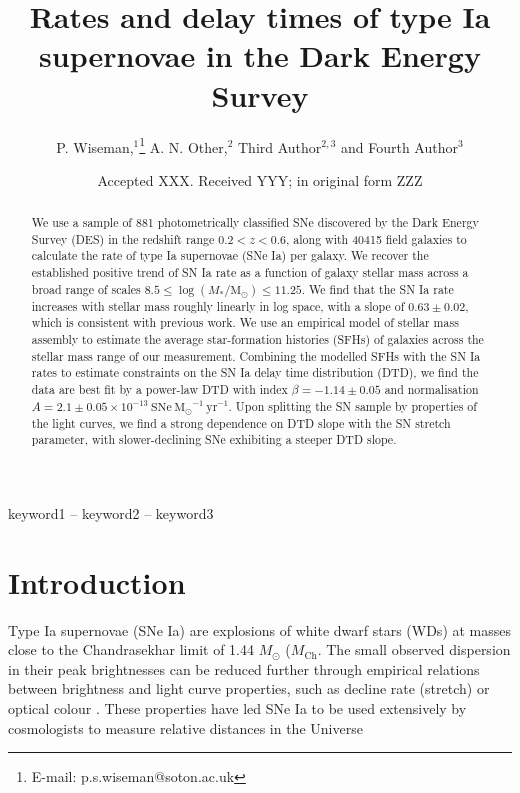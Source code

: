\documentclass[fleqn,usenatbib]{mnras}
\title[Rates of SNe Ia in DES]{Rates and delay times of type Ia supernovae in the Dark Energy Survey}
\author[P. Wiseman et al.]{
P. Wiseman,$^{1}$\thanks{E-mail: p.s.wiseman@soton.ac.uk}
A. N. Other,$^{2}$
Third Author$^{2,3}$
and Fourth Author$^{3}$
\\
}
\date{Accepted XXX. Received YYY; in original form ZZZ}
\begin{document}
\label{firstpage}
\pagerange{\pageref{firstpage}--\pageref{lastpage}}
\maketitle

\begin{abstract}
We use a sample of 881 photometrically classified SNe discovered by the Dark Energy Survey (DES) in the redshift range $0.2 < z <0.6$, along with 40415 field galaxies to calculate the rate of type Ia supernovae (SNe Ia) per galaxy. We recover the established positive trend of SN Ia rate as a function of galaxy stellar mass across a broad range of scales $8.5 \leq \log(M_*/\mathrm{M}_{\odot}) \leq 11.25$. We find that the SN Ia rate increases with stellar mass roughly linearly in log space, with a slope of $0.63 \pm 0.02$, which is consistent with previous work. We use an empirical model of stellar mass assembly to estimate the average star-formation histories (SFHs) of galaxies across the stellar mass range of our measurement. Combining the modelled SFHs with the SN Ia rates to estimate constraints on the SN Ia delay time distribution (DTD), we find the data are best fit by a power-law DTD with index $\beta = -1.14 \pm 0.05$ and normalisation $A = 2.1 \pm0.05 \times 10^{-13}~\mathrm{SNe}~{\mathrm{M}_{\odot}}^{-1}~\mathrm{yr}^{-1}$. Upon splitting the SN sample by properties of the light curves, we find a strong dependence on DTD slope with the SN stretch parameter, with slower-declining SNe exhibiting a steeper DTD slope.
\end{abstract}

\begin{keywords}
keyword1 -- keyword2 -- keyword3
\end{keywords}



\section{Introduction}

Type Ia supernovae (SNe Ia) are explosions of white dwarf stars (WDs) at masses close to the Chandrasekhar limit of 1.44 $M_{\odot}$ ($M_{\mathrm{Ch}}$. The small observed dispersion in their peak brightnesses can be reduced further through empirical relations between brightness and light curve properties, such as decline rate (stretch) or optical colour \citep{Phillips1993,Tripp1998}. These properties have led SNe Ia to be used extensively by cosmologists to measure relative distances in the Universe \citep{Perlmutter1998,Riess1998}
\end{document}
